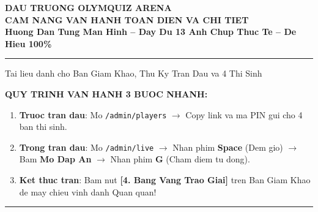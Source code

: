 \documentclass[11pt,a4paper]{article}
\begin{document}
\begin{center}
    \vspace*{0.6cm}
    {\Huge\bfseries\color{navy} DAU TRUONG OLYMQUIZ ARENA}\\[0.3cm]
    {\LARGE\bfseries\color{primary} CAM NANG VAN HANH TOAN DIEN VA CHI TIET}\\[0.3cm]
    {\large\bfseries\color{gold} Huong Dan Tung Man Hinh -- Day Du 13 Anh Chup Thuc Te -- De Hieu 100\%}\\[0.2cm]
    \rule{\textwidth}{1.5pt}
    \vspace{0.3cm}
    {\small Tai lieu danh cho Ban Giam Khao, Thu Ky Tran Dau va 4 Thi Sinh}
    \vspace{0.5cm}
\end{center}

\noindent\textbf{\large QUY TRINH VAN HANH 3 BUOC NHANH:}\\
\begin{enumerate}[leftmargin=*,itemsep=3pt]
    \item \textbf{Truoc tran dau}: Mo \texttt{/admin/players} $\rightarrow$ Copy link va ma PIN gui cho 4 ban thi sinh.
    \item \textbf{Trong tran dau}: Mo \texttt{/admin/live} $\rightarrow$ Nhan phim \textbf{Space} (Dem gio) $\rightarrow$ Bam \textbf{Mo Dap An} $\rightarrow$ Nhan phim \textbf{G} (Cham diem tu dong).
    \item \textbf{Ket thuc tran}: Bam nut \textbf{[4. Bang Vang Trao Giai]} tren Ban Giam Khao de may chieu vinh danh Quan quan!
\end{enumerate}

\vspace{0.3cm}
\hrule
\vspace{0.5cm}
\end{document}
